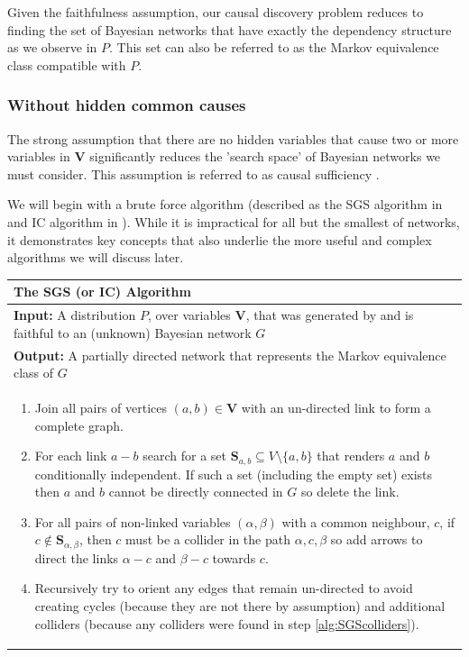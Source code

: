 Given the faithfulness assumption, our causal discovery problem reduces to finding the set of Bayesian networks that have exactly the dependency structure as we observe in $P$. This set can also be referred to as the Markov equivalence class compatible with $P$.

\subsubsection{Without hidden common causes}
The strong assumption that there are no hidden variables that cause two or more variables in $\boldsymbol{V}$ significantly reduces the 'search space' of Bayesian networks we must consider. This assumption is referred to as causal sufficiency \citep{Sprites2000}.

We will begin with a brute force algorithm (described as the SGS algorithm in \citet{Sprites2000} and IC algorithm in \citet{Pearl2000}). While it is impractical for all but the smallest of networks, it demonstrates key concepts that also underlie the more useful and complex algorithms we will discuss later. 

\begin{table}[H]
 \begin{tabularx}{\textwidth}{X}
 \hline
\rule{0pt}{2.5ex} 
 \textbf{The SGS (or IC) Algorithm}\\
 \hline
 \rule{0pt}{2.5ex}
\textbf{Input:} A distribution $P$, over variables $\boldsymbol{V}$, that was generated by and is faithful to an (unknown) Bayesian network $G$\\
\textbf{Output:} A partially directed network that represents the Markov equivalence class of $G$\\
 \begin{enumerate}[itemsep=8pt]
  \item Join all pairs of vertices $(a,b) \in \boldsymbol{V}$ with an un-directed link to form a complete graph.
  \item For each link $a-b$ search for a set $\boldsymbol{S}_{a,b} \subseteq V \setminus \{a,b\}$ that renders $a$ and $b$ conditionally independent. If such a set (including the empty set) exists then $a$ and $b$ cannot be directly connected in $G$ so delete the link.
  \label{alg:SGSexponential}
  
  \item For all pairs of non-linked variables $(\alpha,\beta)$ with a common neighbour, $c$, if $c \notin \boldsymbol{S}_{\alpha,\beta}$, then $c$ must be a collider in the path $\alpha,c,\beta$ so  add arrows to direct the links $\alpha-c$ and $\beta-c$ towards $c$.
  \label{alg:SGScolliders}  
  \item Recursively try to orient any edges that remain un-directed to avoid creating cycles (because they are not there by assumption) and additional colliders (because any colliders were found in step \ref{alg:SGScolliders}).
  \label{alg:SGSfinal}
\end{enumerate}\\
 \hline
\end{tabularx}
\end{table}

